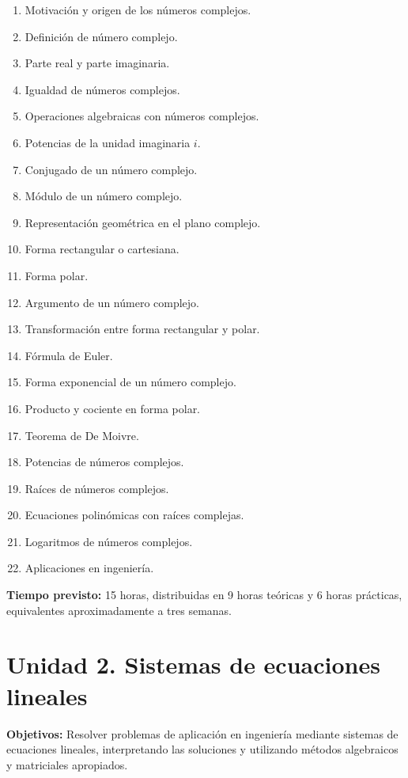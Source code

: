 \documentclass[12pt]{article}
\begin{document}
\begin{enumerate}
    \item Motivación y origen de los números complejos.
    \item Definición de número complejo.
    \item Parte real y parte imaginaria.
    \item Igualdad de números complejos.
    \item Operaciones algebraicas con números complejos.
    \item Potencias de la unidad imaginaria $i$.
    \item Conjugado de un número complejo.
    \item Módulo de un número complejo.
    \item Representación geométrica en el plano complejo.
    \item Forma rectangular o cartesiana.
    \item Forma polar.
    \item Argumento de un número complejo.
    \item Transformación entre forma rectangular y polar.
    \item Fórmula de Euler.
    \item Forma exponencial de un número complejo.
    \item Producto y cociente en forma polar.
    \item Teorema de De Moivre.
    \item Potencias de números complejos.
    \item Raíces de números complejos.
    \item Ecuaciones polinómicas con raíces complejas.
    \item Logaritmos de números complejos.
    \item Aplicaciones en ingeniería.
\end{enumerate}

\textbf{Tiempo previsto:} 15 horas, distribuidas en 9 horas teóricas
y 6 horas prácticas, equivalentes aproximadamente a tres semanas.

\section{Unidad 2. Sistemas de ecuaciones lineales}

\textbf{Objetivos:}  Resolver problemas de aplicación en ingeniería mediante sistemas de ecuaciones lineales, interpretando las soluciones y utilizando métodos algebraicos y matriciales apropiados.
\end{document}
